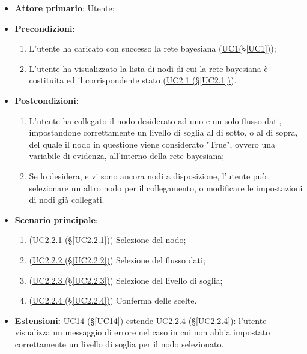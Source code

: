 \begin{itemize}
\item \textbf{Attore primario}: Utente;
\item \textbf{Precondizioni}: 
\begin{enumerate}
	\item L'utente ha caricato con successo la rete bayesiana (\hyperref[UC1]{UC1(§\ref*{UC1})});
	\item L'utente ha visualizzato la lista di nodi di cui la rete bayesiana è costituita ed il corrispondente stato 			(\hyperref[UC2.1]{UC2.1 (§\ref*{UC2.1})}).
\end{enumerate}
\item \textbf{Postcondizioni}: 
	\begin{enumerate}
	\item L'utente ha collegato il nodo desiderato ad uno e un solo flusso dati, impostandone correttamente un livello di soglia al di sotto, o al di sopra, del quale il nodo in questione viene considerato "True", ovvero una variabile di evidenza, all'interno della rete bayesiana;
	\item Se lo desidera, e vi sono ancora nodi a disposizione, l’utente può selezionare un altro nodo per il collegamento, o modificare le impostazioni di nodi già collegati.
	\end{enumerate}
\item \textbf{Scenario principale}:
 \begin{enumerate}
 \item (\hyperref[UC2.2.1]{UC2.2.1 (§\ref*{UC2.2.1})}) Selezione del nodo;
 \item (\hyperref[UC2.2.2]{UC2.2.2 (§\ref*{UC2.2.2})}) Selezione del flusso dati;
 \item (\hyperref[UC2.2.3]{UC2.2.3 (§\ref*{UC2.2.3})}) Selezione del livello di soglia;
 \item (\hyperref[UC2.2.4]{UC2.2.4 (§\ref*{UC2.2.4})}) Conferma delle scelte.
 \end{enumerate}
\item \textbf{Estensioni:} \hyperref[UC14]{UC14 (§\ref*{UC14})} estende \hyperref[UC2.2.4]{UC2.2.4 (§\ref*{UC2.2.4})}: l'utente visualizza un messaggio di errore nel caso in cui non abbia impostato correttamente 	un livello di soglia per il nodo selezionato.
\end{itemize}

